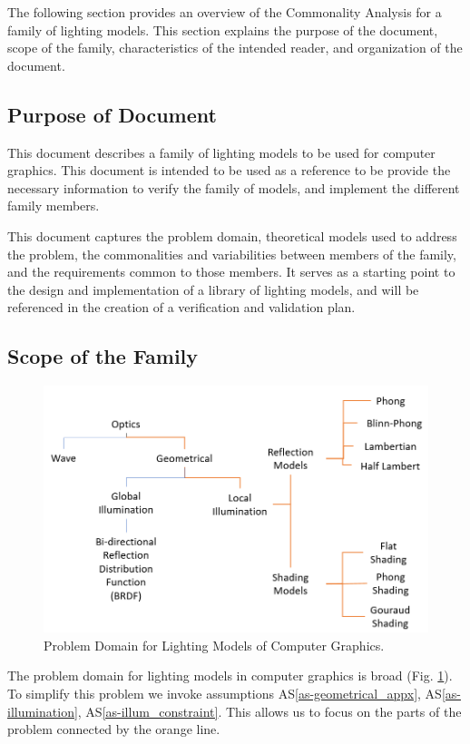 \documentclass[12pt]{article}
\newcommand{\aSref}[1]{AS\ref{#1}}
\begin{document}
The following section provides an overview of the Commonality Analysis for a 
family of lighting models. This section explains the purpose of the document, 
scope of the family, characteristics of the intended reader, and organization 
of the document.

\subsection{Purpose of Document}
This document describes a family of lighting models to be used for computer 
graphics. This document is intended to be used as a reference to be provide the 
necessary information to verify the family of models, and implement the 
different family members. 

This document captures the problem domain, theoretical models used to address 
the problem, the commonalities and variabilities between members of the family, 
and the requirements common to those members. It serves as a starting point to 
the design and implementation of a library of lighting models, and will be 
referenced in the creation of a verification and validation plan.

\subsection{Scope of the Family} \label{sec_problem_definition}
\begin{figure}[h]
	\centering
	\includegraphics[scale=0.5]{./images/problem-domain-analysis}
	\caption{Problem Domain for Lighting Models of Computer Graphics.}
	\label{fig:prob-domain-analysis}
\end{figure}

The problem domain for lighting models in computer graphics is broad (Fig. 
\ref{fig:prob-domain-analysis}). To simplify this problem we invoke assumptions 
\aSref{as-geometrical_appx}, \aSref{as-illumination}, 
\aSref{as-illum_constraint}. This 
allows us to focus on the parts of the problem connected by the orange line.
\end{document}
